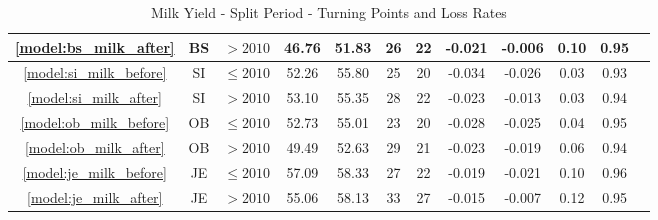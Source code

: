 \begin{table}[htbp]
\begin{tabular}{c c c c c c c c c c c c}
        \textcolor{blue}{\ref{model:bs_milk_after}}& BS & $>2010$ & 46.76 & 51.83 & 26 & 22 & -0.021 & -0.006 & 0.10 & 0.95\\
        \hline
        \textcolor{blue}{\ref{model:si_milk_before}}& SI & $\leq 2010$ & 52.26 & 55.80 & 25 & 20 & -0.034 & -0.026 & 0.03 & 0.93\\
        \textcolor{blue}{\ref{model:si_milk_after}}& SI & $>2010$ & 53.10 & 55.35 & 28 & 22 & -0.023 & -0.013 & 0.03 & 0.94\\
        \hline
        \textcolor{blue}{\ref{model:ob_milk_before}}& OB & $\leq 2010$ & 52.73 & 55.01 & 23 & 20 & -0.028 & -0.025 & 0.04 & 0.95\\
        \textcolor{blue}{\ref{model:ob_milk_after}}& OB & $>2010$ & 49.49 & 52.63 & 29 & 21 & -0.023 & -0.019 & 0.06 & 0.94\\
        \hline
        \textcolor{blue}{\ref{model:je_milk_before}}& JE & $\leq 2010$ & 57.09 & 58.33 & 27 & 22 & -0.019 & -0.021 & 0.10 & 0.96\\
        \textcolor{blue}{\ref{model:je_milk_after}}& JE & $>2010$ & 55.06 & 58.13 & 33 & 27 & -0.015 & -0.007 & 0.12 & 0.95\\            
        \bottomrule
    \end{tabular}
    \caption{Milk Yield - Split Period - Turning Points and Loss Rates}
    \label{table:milk_yield_split_period}
\end{table}


